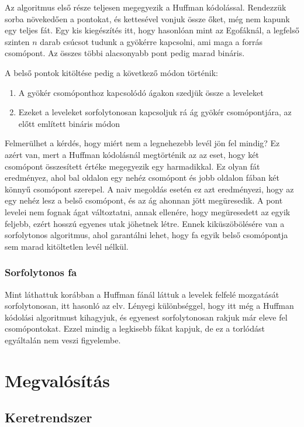 \documentclass[12pt]{report}
\begin{document}
Az algoritmus első része teljesen megegyezik a Huffman kódolással.
Rendezzük sorba növekedően a pontokat, és kettesével vonjuk össze őket, még nem kapunk egy teljes fát.
Egy kis kiegészítés itt, hogy hasonlóan mint az Egofáknál, a legfelső szinten \(n\) darab csúcsot tudunk a gyökérre kapcsolni, ami maga a forrás csomópont.
Az összes többi alacsonyabb pont pedig marad bináris.

A belső pontok kitöltése pedig a következő módon történik:
\begin{enumerate}
	\item A gyökér csomóponthoz kapcsolódó ágakon szedjük össze a leveleket
	\item Ezeket a leveleket sorfolytonosan kapcsoljuk rá ág gyökér csomópontjára, az előtt említett bináris módon
\end{enumerate}
 
Felmerülhet a kérdés, hogy miért nem a legnehezebb levél jön fel mindig?
Ez azért van, mert a Huffman kódolásnál megtörténik az az eset, hogy két csomópont összesített értéke megegyezik egy harmadikkal.
Ez olyan fát eredményez, ahol bal oldalon egy nehéz csomópont és jobb oldalon fában két könnyű csomópont szerepel.
A naiv megoldás esetén ez azt eredményezi, hogy az egy nehéz lesz a belső csomópont, és az ág ahonnan jött megüresedik.
A pont levelei nem fognak ágat változtatni, annak ellenére, hogy megüresedett az egyik feljebb, ezért hosszú egyenes utak jöhetnek létre.
Ennek kiküszöbölésére van a sorfolytonos algoritmus, ahol garantálni lehet, hogy fa egyik belső csomópontja sem marad kitöltetlen levél nélkül.

\subsection{Sorfolytonos fa}

Mint láthattuk korábban a Huffman fánál láttuk a levelek felfelé mozgatását sorfolytonosan, itt hasonló az elv.
Lényegi különbséggel, hogy itt még a Huffman kódolási algoritmust kihagyjuk, és egyenest sorfolytonosan rakjuk már eleve fel csomópontokat.
Ezzel mindig a legkisebb fákat kapjuk, de ez a torlódást egyáltalán nem veszi figyelembe.

\chapter{Megvalósítás}

\section{Keretrendszer}
\end{document}
